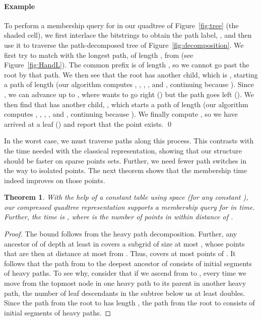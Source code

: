 \documentclass{elsarticle}
\newtheorem{theorem}{Theorem}
\newenvironment{example}{\paragraph{Example}}{\qed \medskip }
\begin{document}
\begin{example}
To perform a membership query for  in our quadtree of Figure~\ref{fig:tree} (the shaded cell), we first interlace the bitstrings to obtain the path label, , and then use it to traverse the path-decomposed tree  of Figure~\ref{fig:decomposition}. We first try to match  with the longest path, of length , from  (see Figure~\ref{fig:HandL}). The common prefix is of length , so we cannot go past the root by that path. We then see that the root has another child, which is , starting a path of length  (our algorithm computes , , , , and , continuing because ). Since , we can advance up to , where  wants to go right () but the path goes left (). We then find that  has another child, , which starts a path of length  (our algorithm computes , , , , and , continuing because ). We finally compute , so we have arrived at a leaf () and report that the point exists.
\end{example}

In the worst case, we must traverse  paths along this process. This contrasts with the  time needed with the classical representation, showing that our structure should be faster on sparse points sets. Further, we need fewer path switches in the way to isolated points. The next theorem shows that the membership time indeed improves on those points.

\begin{theorem}
\label{thm:membership}
With the help of a constant table using  space (for any constant 
), our compressed quadtree representation supports a membership 
query for  in  time. Further, the time is , where  is the number of points in  within distance  of .
\end{theorem}

\begin{proof}
The  bound follows from the heavy path decomposition. Further,
any ancestor  of  of depth at least  in  covers a subgrid of size at most , whose points that are then at distance at most  from . Thus,  covers at most  points of .  It follows that the path from  to the deepest ancestor  of  consists of  initial segments of heavy paths.  To see why, consider that if we ascend from  to , every time we move from the topmost node in one heavy path to its parent in another heavy path, the number of leaf descendants in the subtree below us at least doubles.  Since the path from the root to  has length , the path from the root to  consists of  initial segments of heavy paths.
\end{proof}
\end{document}
